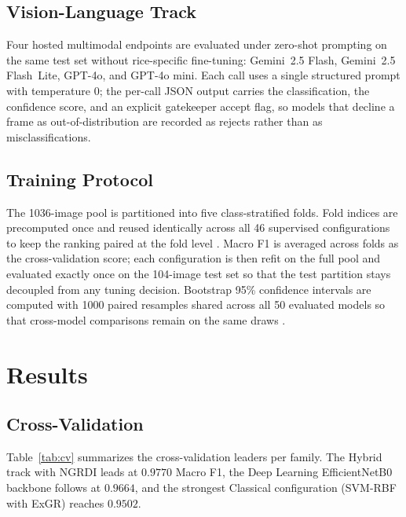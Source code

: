 \documentclass[conference]{IEEEtran}
\begin{document}
\subsection{Vision-Language Track}
Four hosted multimodal endpoints are evaluated under zero-shot prompting on the same test set without rice-specific fine-tuning: Gemini~2.5 Flash, Gemini~2.5 Flash~Lite, GPT-4o, and GPT-4o mini. Each call uses a single structured prompt with temperature 0; the per-call JSON output carries the classification, the confidence score, and an explicit gatekeeper accept flag, so models that decline a frame as out-of-distribution are recorded as rejects rather than as misclassifications.

\subsection{Training Protocol}
The 1036-image pool is partitioned into five class-stratified folds. Fold indices are precomputed once and reused identically across all 46 supervised configurations to keep the ranking paired at the fold level \cite{b_szeghalmy}. Macro F1 is averaged across folds as the cross-validation score; each configuration is then refit on the full pool and evaluated exactly once on the 104-image test set so that the test partition stays decoupled from any tuning decision. Bootstrap 95\% confidence intervals are computed with 1000 paired resamples shared across all 50 evaluated models so that cross-model comparisons remain on the same draws \cite{b_takahashi}.

\section{Results}
\subsection{Cross-Validation}
Table~\ref{tab:cv} summarizes the cross-validation leaders per family. The Hybrid track with NGRDI leads at $0.9770$ Macro F1, the Deep Learning EfficientNetB0 backbone follows at $0.9664$, and the strongest Classical configuration (SVM-RBF with ExGR) reaches $0.9502$.
\end{document}
